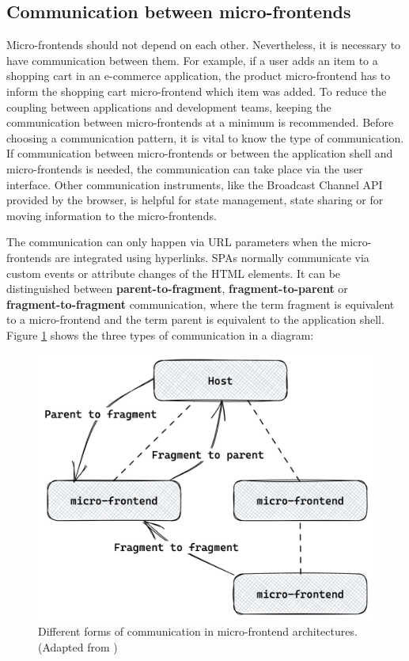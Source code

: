 \subsection{Communication between micro-frontends}\label{subsection:background:micro-frontend:communication-patterns}

Micro-frontends should not depend on each other. Nevertheless, it is necessary to have communication between them. For example, if a user adds an item to a shopping cart in an e-commerce application, the product micro-frontend has to inform the shopping cart micro-frontend which item was added. To reduce the coupling between applications and development teams, keeping the communication between micro-frontends at a minimum is recommended. Before choosing a communication pattern, it is vital to know the type of communication. If communication between micro-frontends or between the application shell and micro-frontends is needed, the communication can take place via the user interface. \cite{book:2020:geers:background:micro-frontends:micro-frontends-in-action} Other communication instruments, like the Broadcast Channel \ac{API} provided by the browser, is helpful for state management, state sharing or for moving information to the micro-frontends. \cite{misc:-:background:micro-frontends:broadcast-channel-api} 

\bigskip

\noindent The communication can only happen via URL parameters when the micro-frontends are integrated using hyperlinks. \acp{SPA} normally communicate via custom events or attribute changes of the \ac{HTML} elements. \cite[100]{book:2020:geers:background:micro-frontends:micro-frontends-in-action} \cite[315-316]{book:2019:farrell:background:micro-frontends:web-components-in-action} It can be distinguished between \textbf{parent-to-fragment}, \textbf{fragment-to-parent} or \textbf{fragment-to-fragment} communication, where the term fragment is equivalent to a micro-frontend and the term parent is equivalent to the application shell. \cite{book:2020:geers:background:micro-frontends:micro-frontends-in-action} Figure \ref{fig:background:micro-frontend:communication:communication-patterns} shows the three types of communication in a diagram:

\ifshowImages
\begin{figure}[H]
  \centering
  \includegraphics[width=0.5\linewidth]{images/background/micro-frontends/communication/communication-patterns.png}
  \caption{Different forms of communication in micro-frontend architectures. (Adapted from \cite[100]{book:2020:geers:background:micro-frontends:micro-frontends-in-action})}\label{fig:background:micro-frontend:communication:communication-patterns}
\end{figure}
\fi

